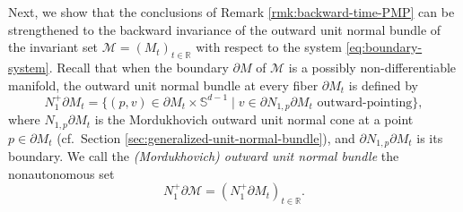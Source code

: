 \documentclass[reqno]{amsart}
\newtheorem{cor}[thm]{Corollary}
\theoremstyle{definition}
\numberwithin{equation}{section}
\newcommand{\R}{\mathbb{R}}
\newcommand{\M}{\mathscr{M}}
\newcommand{\U}{\mathcal{U}}
\begin{document}

Next, we show that the conclusions of Remark \ref{rmk:backward-time-PMP} can be strengthened to the backward invariance of the outward unit normal bundle of the invariant set $\M=(M_t)_{t\in\R}$ with respect to the system \eqref{eq:boundary-system}. Recall that when the boundary $\partial M$ of $\M$ is a possibly non-differentiable manifold, the outward unit normal bundle at every fiber $\partial M_t$ is defined by 
\[
N^+_1\partial M_t=\big\{(p,v)\in \partial M_t\times \mathbb{S}^{d-1}\mid v\in  \partial N_{1,p}\partial M_t \text{ outward-pointing}\big\},
\]
where $N_{1,p}\partial M_t$ is the Mordukhovich outward unit normal cone at a point $p\in\partial M_t$ (cf.~Section \ref{sec:generalized-unit-normal-bundle}), and $\partial N_{1,p}\partial M_t$ is its boundary.
We call the \emph{(Mordukhovich) outward unit normal bundle} the nonautonomous set 
\[
N^+_1\partial \M=(N^+_1\partial M_t)_{t\in\R}.
\]
\end{document}
